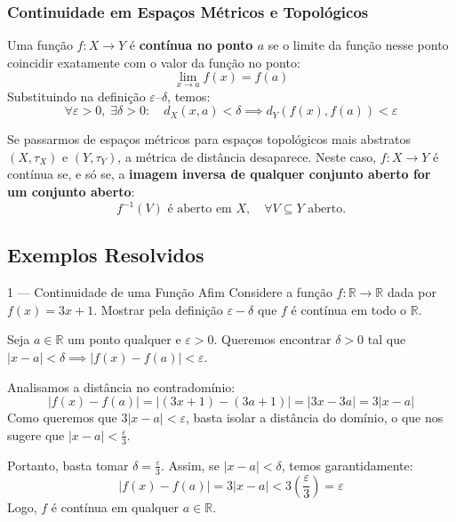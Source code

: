 \subsubsection*{Continuidade em Espaços Métricos e Topológicos}

\begin{defbox}[title={Continuidade Num Ponto}]
  Uma função $f:X\to Y$ é \textbf{contínua no ponto $a$} se o limite da função nesse ponto coincidir exatamente com o valor da função no ponto:
  \[
    \lim_{x\to a} f(x)=f(a)
  \]
  Substituindo na definição $\varepsilon$--$\delta$, temos:
  \[
    \forall \varepsilon>0, \;\exists \delta>0 : \quad d_X(x,a)<\delta \implies d_Y(f(x),f(a))<\varepsilon
  \]
\end{defbox}

\begin{thmbox}[title={Critério Topológico Global}]
  Se passarmos de espaços métricos para espaços topológicos mais abstratos $(X,\tau_X)$ e $(Y,\tau_Y)$, a métrica de distância desaparece. 
  Neste caso, $f:X\to Y$ é contínua se, e só se, a \textbf{imagem inversa de qualquer conjunto aberto for um conjunto aberto}:
  \[
    f^{-1}(V) \text{ é aberto em } X, \quad \forall V \subseteq Y \text{ aberto.}
  \]
\end{thmbox}

\subsection{Exemplos Resolvidos}

\begin{exbox}{1 --- Continuidade de uma Função Afim}
  Considere a função $f:\mathbb{R}\to\mathbb{R}$ dada por $f(x)=3x+1$. Mostrar pela definição $\varepsilon-\delta$ que $f$ é contínua em todo o $\mathbb{R}$.
\end{exbox}
\begin{solbox}
  Seja $a \in \mathbb{R}$ um ponto qualquer e $\varepsilon > 0$. Queremos encontrar $\delta > 0$ tal que $|x-a| < \delta \implies |f(x)-f(a)| < \varepsilon$.
  
  Analisamos a distância no contradomínio:
  \[
    |f(x)-f(a)| = |(3x+1) - (3a+1)| = |3x - 3a| = 3|x-a|
  \]
  Como queremos que $3|x-a| < \varepsilon$, basta isolar a distância do domínio, o que nos sugere que $|x-a| < \frac{\varepsilon}{3}$.
  
  Portanto, basta tomar \textbf{$\delta = \frac{\varepsilon}{3}$}. Assim, se $|x-a| < \delta$, temos garantidamente:
  \[
    |f(x)-f(a)| = 3|x-a| < 3\left(\frac{\varepsilon}{3}\right) = \varepsilon
  \]
  Logo, $f$ é contínua em qualquer $a \in \mathbb{R}$. \checkmark
\end{solbox}

